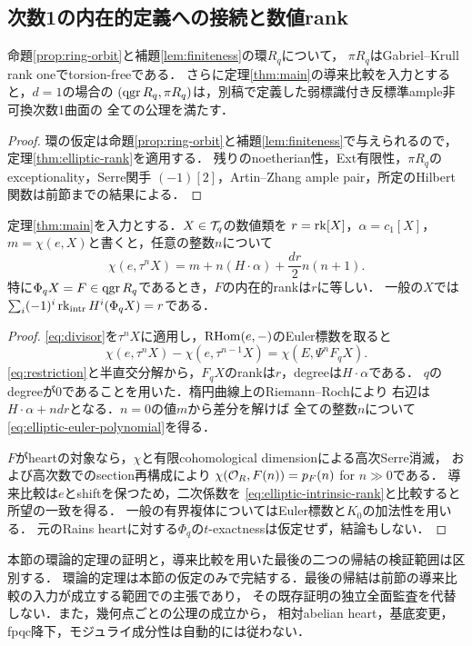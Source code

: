 \subsection{次数1の内在的定義への接続と数値rank}

\begin{corollary}[楕円領域でのrank公理]\label{cor:elliptic-intrinsic-heart}
命題\ref{prop:ring-orbit}と補題\ref{lem:finiteness}の環$R_q$について，
$\pi R_q$はGabriel--Krull rank oneでtorsion-freeである．
さらに定理\ref{thm:main}の導来比較を入力とすると，$d=1$の場合の
$(\operatorname{qgr} R_q,\pi R_q)$は，別稿で定義した弱標識付き反標準ample非可換次数1曲面の
全ての公理を満たす．
\end{corollary}
\begin{proof}
環の仮定は命題\ref{prop:ring-orbit}と補題\ref{lem:finiteness}で与えられるので，
定理\ref{thm:elliptic-rank}を適用する．
残りのnoetherian性，Ext有限性，$\pi R_q$のexceptionality，Serre関手
$(-1)[2]$，Artin--Zhang ample pair，所定のHilbert関数は前節までの結果による．
\end{proof}

\begin{proposition}[導来比較の下での数値rankとの一致]\label{prop:elliptic-numerical-rank}
定理\ref{thm:main}を入力とする．$X\in\mathcal T_q$の数値類を
$r=\operatorname{rk}[X]$，$\alpha=c_1[X]$，$m=\chi(e,X)$と書くと，任意の整数$n$について
\begin{equation}\label{eq:elliptic-euler-polynomial}
 \chi(e,\tau^nX)=m+n(H\cdot\alpha)+\frac{dr}{2}n(n+1).
\end{equation}
特に$\Phi_qX=F\in\operatorname{qgr} R_q$であるとき，$F$の内在的rankは$r$に等しい．
一般の$X$では$\sum_i(-1)^i\operatorname{rk}_{\mathrm{intr}}H^i(\Phi_qX)=r$である．
\end{proposition}
\begin{proof}
\eqref{eq:divisor}を$\tau^nX$に適用し，$\operatorname{RHom}(e,-)$のEuler標数を取ると
\[
 \chi(e,\tau^nX)-\chi(e,\tau^{n-1}X)
 =\chi(E,\Psi^nF_qX).
\]
\eqref{eq:restriction}と半直交分解から，$F_qX$のrankは$r$，degreeは$H\cdot\alpha$である．
$q$のdegreeが0であることを用いた．楕円曲線上のRiemann--Rochにより
右辺は$H\cdot\alpha+ndr$となる．$n=0$の値$m$から差分を解けば
全ての整数$n$について\eqref{eq:elliptic-euler-polynomial}を得る．

$F$がheartの対象なら，$\chi$と有限cohomological dimensionによる高次Serre消滅，
および高次数でのsection再構成により
$\chi(\mathcal O_R,F(n))=p_F(n)$ for $n\gg0$である．
導来比較は$e$とshiftを保つため，二次係数を
\eqref{eq:elliptic-intrinsic-rank}と比較すると所望の一致を得る．
一般の有界複体についてはEuler標数と$K_0$の加法性を用いる．
元のRains heartに対する$\Phi_q$の$t$-exactnessは仮定せず，結論もしない．
\end{proof}

本節の環論的定理の証明と，導来比較を用いた最後の二つの帰結の検証範囲は区別する．
環論的定理は本節の仮定のみで完結する．最後の帰結は前節の導来比較の入力が成立する範囲での主張であり，
その既存証明の独立全面監査を代替しない．また，幾何点ごとの公理の成立から，
相対abelian heart，基底変更，fpqc降下，モジュライ成分性は自動的には従わない．
